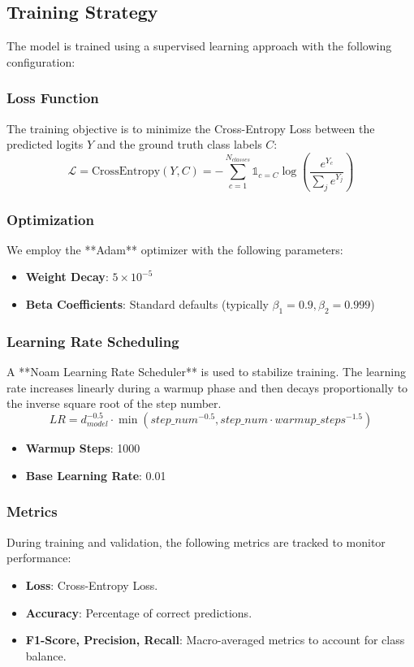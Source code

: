 \documentclass[11pt,a4paper]{article}
\begin{document}



\subsection{Training Strategy}
The model is trained using a supervised learning approach with the following configuration:

\subsubsection{Loss Function}
The training objective is to minimize the Cross-Entropy Loss between the predicted logits $Y$ and the ground truth class labels $C$:
\begin{equation}
    \mathcal{L} = \text{CrossEntropy}(Y, C) = -\sum_{c=1}^{N_{classes}} \mathbb{1}_{c=C} \log\left(\frac{e^{Y_c}}{\sum_{j} e^{Y_j}}\right)
\end{equation}

\subsubsection{Optimization}
We employ the **Adam** optimizer with the following parameters:
\begin{itemize}
    \item \textbf{Weight Decay}: $5 \times 10^{-5}$
    \item \textbf{Beta Coefficients}: Standard defaults (typically $\beta_1=0.9, \beta_2=0.999$)
\end{itemize}

\subsubsection{Learning Rate Scheduling}
A **Noam Learning Rate Scheduler** is used to stabilize training. The learning rate increases linearly during a warmup phase and then decays proportionally to the inverse square root of the step number.
\begin{equation}
    LR = d_{model}^{-0.5} \cdot \min(step\_num^{-0.5}, step\_num \cdot warmup\_steps^{-1.5})
\end{equation}
\begin{itemize}
    \item \textbf{Warmup Steps}: 1000
    \item \textbf{Base Learning Rate}: 0.01
\end{itemize}

\subsubsection{Metrics}
During training and validation, the following metrics are tracked to monitor performance:
\begin{itemize}
    \item \textbf{Loss}: Cross-Entropy Loss.
    \item \textbf{Accuracy}: Percentage of correct predictions.
    \item \textbf{F1-Score, Precision, Recall}: Macro-averaged metrics to account for class balance.
\end{itemize}
\end{document}
